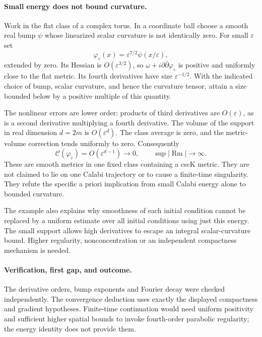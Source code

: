 \documentclass[11pt]{article}
\begin{document}
\paragraph{Small energy does not bound curvature.}
Work in the flat class of a complex torus. In
a coordinate ball choose a smooth real bump
$\psi$ whose linearized scalar curvature is
not identically zero. For small $\varepsilon$ set
\[
 \varphi_\varepsilon(x)
             =\varepsilon^{7/2}\psi(x/\varepsilon),
\]
extended by zero. Its Hessian is
$O(\varepsilon^{3/2})$, so
$\omega+i\partial\bar\partial\varphi_\varepsilon$
is positive and uniformly close to the flat
metric. Its fourth derivatives have size
$\varepsilon^{-1/2}$. With the indicated
choice of bump, scalar curvature, and hence
the curvature tensor, attain a size bounded
below by a positive multiple of this quantity.

The nonlinear errors are lower order: products
of third derivatives are $O(\varepsilon)$,
as is a second derivative multiplying a
fourth derivative. The volume of the support
in real dimension $d=2m$ is
$O(\varepsilon^d)$. The class average is zero,
and the metric-volume correction tends
uniformly to zero. Consequently
\[
 \mathcal C(\varphi_\varepsilon)
                =O(\varepsilon^{d-1})\longrightarrow0,
 \qquad \sup|\operatorname{Rm}|\longrightarrow\infty.
\]
These are smooth metrics in one fixed class
containing a cscK metric. They are not claimed
to lie on one Calabi trajectory or to cause
a finite-time singularity. They refute the
specific a priori implication from small
Calabi energy alone to bounded curvature.

The example also explains why smoothness of
each initial condition cannot be replaced
by a uniform estimate over all initial
conditions using just this energy. The
small support allows high derivatives to
escape an integral scalar-curvature bound.
Higher regularity, nonconcentration or an
independent compactness mechanism is needed.

\paragraph{Verification, first gap, and outcome.}
The derivative orders, bump exponents and
Fourier decay were checked independently.
The convergence deduction uses exactly the
displayed compactness and gradient hypotheses.
Finite-time continuation would need uniform
positivity and sufficient higher spatial
bounds to invoke fourth-order parabolic
regularity; the energy identity does not
provide them.
\end{document}
